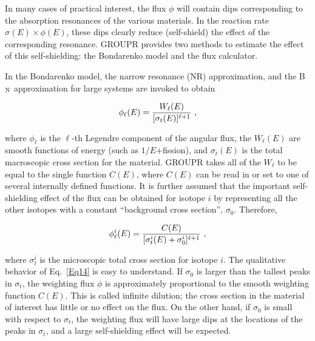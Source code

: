 In many cases of practical interest, the flux $\phi$ will contain dips
corresponding to the absorption resonances of the various materials.
In the reaction rate $\sigma(E)\times\phi(E)$, these dips clearly reduce
(self-shield) the effect of the corresponding resonance.  GROUPR provides
two methods to estimate the effect of this self-shielding: the Bondarenko
model and the flux calculator.

In the Bondarenko model\cite{Bondarenko}, the narrow resonance (NR)
approximation, and the
B$_{\rm N}$ approximation for large systems\cite{ref5} are invoked
to obtain

  \begin{equation}
    \phi_{\ell}(E)={{W_{\ell}(E)}\over{[\sigma_t(E)]^{\ell+1}}}\,\,,
  \end{equation}

\noindent
where $\phi_{\ell}$ is the $\ell$-th Legendre component of the angular
flux, the $W_\ell(E)$ are smooth functions of energy (such as $1/E$+fission),
and $\sigma_t(E)$ is the total macroscopic cross section for the material.
GROUPR takes all of the $W_{\ell}$ to be equal to the single function $C(E)$,
where $C(E)$ can be read in or set to one of several internally defined
functions.  It is further assumed that the important self-shielding effect
of the flux can be obtained for isotope $i$ by representing all the other
isotopes with a constant ``background cross section'', $\sigma_0$.  Therefore,

   \begin{equation}
    \phi_{\ell}^i(E)={{C(E)}\over
    {[\sigma_t^i(E)+\sigma_0^i]^{\ell+1}}} \,\,,
  \label{Eq14}
  \end{equation}

\noindent
where $\sigma_t^i$ is the microscopic total cross section for isotope $i$.
The qualitative behavior of Eq.~\ref{Eq14} is easy to understand.
If $\sigma_0$ is larger than the tallest peaks in $\sigma_t$, the weighting
flux $\phi$ is approximately proportional to the smooth weighting function
$C(E)$.  This is called infinite dilution;
 the cross section in the material of interest has little or no effect
on the flux.  On the other hand, if $\sigma_0$ is small with respect
to $\sigma_t$, the weighting flux will have large dips at the locations
of the peaks in $\sigma_t$, and a large self-shielding effect will
be expected.

